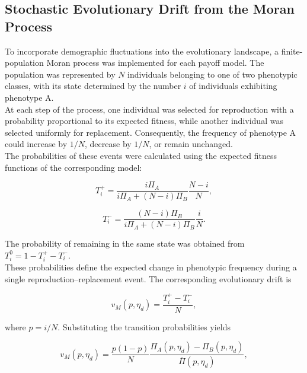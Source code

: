 \subsection{Stochastic Evolutionary Drift from the Moran Process}
\label{sec:moran_methodology}

To incorporate demographic fluctuations into the evolutionary landscape, a finite-population Moran process was implemented for each payoff model. The population was represented by \(N\) individuals belonging to one of two phenotypic classes, with its state determined by the number \(i\) of individuals exhibiting phenotype A. \\ 

At each step of the process, one individual was selected for reproduction with a probability proportional to its expected fitness, while another individual was selected uniformly for replacement. Consequently, the frequency of phenotype A could increase by \(1/N\), decrease by \(1/N\), or remain unchanged. \\ 

The probabilities of these events were calculated using the expected fitness functions of the corresponding model:

\begin{equation}
T_i^+
=
\frac{i\Pi_A}{i\Pi_A+(N-i)\Pi_B}
\frac{N-i}{N},
\label{eq:method_moran_plus}
\end{equation}

\begin{equation}
T_i^-
=
\frac{(N-i)\Pi_B}{i\Pi_A+(N-i)\Pi_B}
\frac{i}{N}.
\label{eq:method_moran_minus}
\end{equation}

The probability of remaining in the same state was obtained from \(T_i^0=1-T_i^+-T_i^-\). \\ 

These probabilities define the expected change in phenotypic frequency during a single reproduction--replacement event. The corresponding evolutionary drift is

\begin{equation}
v_M(p,\eta_d)
=
\frac{T_i^+-T_i^-}{N},
\label{eq:method_moran_drift}
\end{equation}

where \(p=i/N\). Substituting the transition probabilities yields

\begin{equation}
v_M(p,\eta_d)
=
\frac{p(1-p)}{N}
\frac{\Pi_A(p,\eta_d)-\Pi_B(p,\eta_d)}
{\overline{\Pi}(p,\eta_d)},
\label{eq:method_moran_drift_fitness}
\end{equation}

